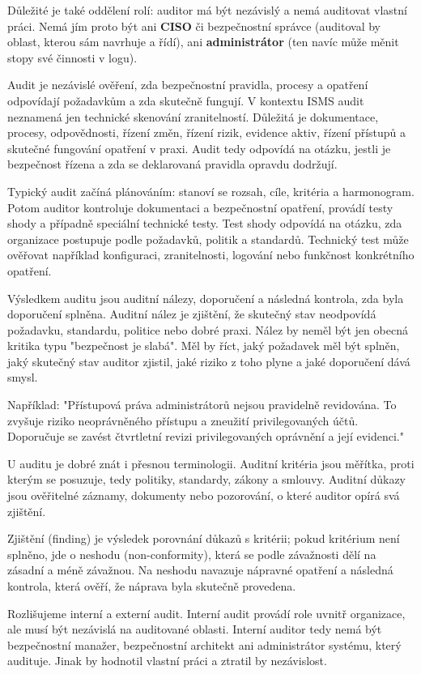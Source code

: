 \documentclass[11pt,a4paper]{article}
\begin{document}
Důležité je také oddělení rolí: auditor má být nezávislý a nemá auditovat vlastní práci. Nemá jím proto být ani \textbf{CISO} či bezpečnostní správce (auditoval by oblast, kterou sám navrhuje a řídí), ani \textbf{administrátor} (ten navíc může měnit stopy své činnosti v logu).

Audit je nezávislé ověření, zda bezpečnostní pravidla, procesy a opatření odpovídají požadavkům a zda skutečně fungují. V kontextu ISMS audit neznamená jen technické skenování zranitelností. Důležitá je dokumentace, procesy, odpovědnosti, řízení změn, řízení rizik, evidence aktiv, řízení přístupů a skutečné fungování opatření v praxi. Audit tedy odpovídá na otázku, jestli je bezpečnost řízena a zda se deklarovaná pravidla opravdu dodržují.

Typický audit začíná plánováním: stanoví se rozsah, cíle, kritéria a harmonogram. Potom auditor kontroluje dokumentaci a bezpečnostní opatření, provádí testy shody a případně speciální technické testy. Test shody odpovídá na otázku, zda organizace postupuje podle požadavků, politik a standardů. Technický test může ověřovat například konfiguraci, zranitelnosti, logování nebo funkčnost konkrétního opatření.

Výsledkem auditu jsou auditní nálezy, doporučení a následná kontrola, zda byla doporučení splněna. Auditní nález je zjištění, že skutečný stav neodpovídá požadavku, standardu, politice nebo dobré praxi. Nález by neměl být jen obecná kritika typu "bezpečnost je slabá". Měl by říct, jaký požadavek měl být splněn, jaký skutečný stav auditor zjistil, jaké riziko z toho plyne a jaké doporučení dává smysl.

Například: "Přístupová práva administrátorů nejsou pravidelně revidována. To zvyšuje riziko neoprávněného přístupu a zneužití privilegovaných účtů. Doporučuje se zavést čtvrtletní revizi privilegovaných oprávnění a její evidenci."

U auditu je dobré znát i přesnou terminologii. Auditní kritéria jsou měřítka, proti kterým se posuzuje, tedy politiky, standardy, zákony a smlouvy. Auditní důkazy jsou ověřitelné záznamy, dokumenty nebo pozorování, o které auditor opírá svá zjištění.

Zjištění (finding) je výsledek porovnání důkazů s kritérii; pokud kritérium není splněno, jde o neshodu (non-conformity), která se podle závažnosti dělí na zásadní a méně závažnou. Na neshodu navazuje nápravné opatření a následná kontrola, která ověří, že náprava byla skutečně provedena.

Rozlišujeme interní a externí audit. Interní audit provádí role uvnitř organizace, ale musí být nezávislá na auditované oblasti. Interní auditor tedy nemá být bezpečnostní manažer, bezpečnostní architekt ani administrátor systému, který audituje. Jinak by hodnotil vlastní práci a ztratil by nezávislost.
\end{document}
